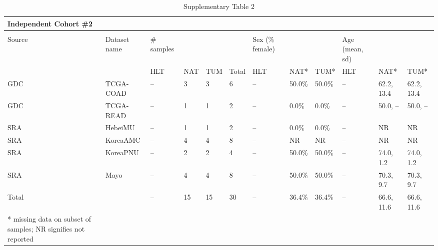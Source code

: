 \begin{table}[ht]
    \centering
    \begin{tabular}{|l|l|l|l|l|l|l|l|l|l|l|l|}
    \hline
        Independent Cohort \#2 &  &  &  &  &  &  &  &  &  &  &  \\ \hline
         &  &  &  &  &  &  &  &  &  &  &  \\ \hline
        Source & Dataset name & \# samples &  &  &  & Sex (\% female) &  &  & Age (mean, sd) &  &  \\ \hline
         &  & HLT & NAT & TUM & Total & HLT & NAT* & TUM* & HLT & NAT* & TUM* \\ \hline
        GDC & TCGA-COAD & -- & 3 & 3 & 6 & -- & 50.0\% & 50.0\% & -- & 62.2, 13.4 & 62.2, 13.4 \\ \hline
        GDC & TCGA-READ & -- & 1 & 1 & 2 & -- & 0.0\% & 0.0\% & -- & 50.0, -- & 50.0, -- \\ \hline
        SRA & HebeiMU & -- & 1 & 1 & 2 & -- & 0.0\% & 0.0\% & -- & NR & NR \\ \hline
        SRA & KoreaAMC & -- & 4 & 4 & 8 & -- & NR & NR & -- & NR & NR \\ \hline
        SRA & KoreaPNU & -- & 2 & 2 & 4 & -- & 50.0\% & 50.0\% & -- & 74.0, 1.2 & 74.0, 1.2 \\ \hline
        SRA & Mayo & -- & 4 & 4 & 8 & -- & 50.0\% & 50.0\% & -- & 70.3, 9.7 & 70.3, 9.7 \\ \hline
        Total &  & -- & 15 & 15 & 30 & -- & 36.4\% & 36.4\% & -- & 66.6, 11.6 & 66.6, 11.6 \\ \hline
        * missing data on subset of samples; NR signifies not reported &  &  &  &  &  &  &  &  &  &  &  \\ \hline
    \end{tabular}
    \caption{Supplementary Table 2}
    \label{tab:ind2}
\end{table}

